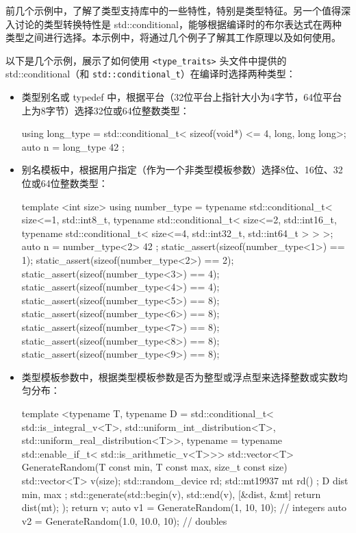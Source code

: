 
前几个示例中，了解了类型支持库中的一些特性，特别是类型特征。另一个值得深入讨论的类型转换特性是 std::conditional，能够根据编译时的布尔表达式在两种类型之间进行选择。本示例中，将通过几个例子了解其工作原理以及如何使用。


以下是几个示例，展示了如何使用 \verb|<type_traits>| 头文件中提供的 std::conditional（和 \verb|std::conditional_t|）在编译时选择两种类型：

\begin{itemize}
\item
类型别名或 typedef 中，根据平台（32位平台上指针大小为4字节，64位平台上为8字节）选择32位或64位整数类型：

\begin{cpp}
using long_type = std::conditional_t<
    sizeof(void*) <= 4, long, long long>;
auto n = long_type{ 42 };
\end{cpp}

\item
别名模板中，根据用户指定（作为一个非类型模板参数）选择8位、16位、32位或64位整数类型：

\begin{cpp}
template <int size>
using number_type =
    typename std::conditional_t<
        size<=1,
        std::int8_t,
        typename std::conditional_t<
            size<=2,
            std::int16_t,
            typename std::conditional_t<
                size<=4,
                std::int32_t,
                std::int64_t
            >
        >
    >;
auto n = number_type<2>{ 42 };
static_assert(sizeof(number_type<1>) == 1);
static_assert(sizeof(number_type<2>) == 2);
static_assert(sizeof(number_type<3>) == 4);
static_assert(sizeof(number_type<4>) == 4);
static_assert(sizeof(number_type<5>) == 8);
static_assert(sizeof(number_type<6>) == 8);
static_assert(sizeof(number_type<7>) == 8);
static_assert(sizeof(number_type<8>) == 8);
static_assert(sizeof(number_type<9>) == 8);
\end{cpp}

\item
类型模板参数中，根据类型模板参数是否为整型或浮点型来选择整数或实数均匀分布：

\begin{cpp}
template <typename T,
          typename D = std::conditional_t<
                       std::is_integral_v<T>,
                       std::uniform_int_distribution<T>,
                       std::uniform_real_distribution<T>>,
          typename = typename std::enable_if_t<
                        std::is_arithmetic_v<T>>>
std::vector<T> GenerateRandom(T const min, T const max,
                              size_t const size)
{
    std::vector<T> v(size);
    std::random_device rd{};
    std::mt19937 mt{ rd() };
    D dist{ min, max };
    std::generate(std::begin(v), std::end(v),
        [&dist, &mt] {return dist(mt); });
    return v;
}
auto v1 = GenerateRandom(1, 10, 10);     // integers
auto v2 = GenerateRandom(1.0, 10.0, 10); // doubles
\end{cpp}
\end{itemize}

